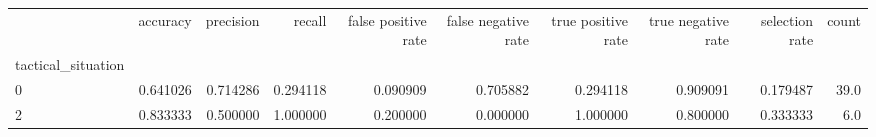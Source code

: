 \begin{tabular}{lrrrrrrrrr}
\toprule
{} &  accuracy &  precision &    recall &  false positive rate &  false negative rate &  true positive rate &  true negative rate &  selection rate &  count \\
tactical\_situation &           &            &           &                      &                      &                     &                     &                 &        \\
\midrule
0                  &  0.641026 &   0.714286 &  0.294118 &             0.090909 &             0.705882 &            0.294118 &            0.909091 &        0.179487 &   39.0 \\
2                  &  0.833333 &   0.500000 &  1.000000 &             0.200000 &             0.000000 &            1.000000 &            0.800000 &        0.333333 &    6.0 \\
\bottomrule
\end{tabular}
